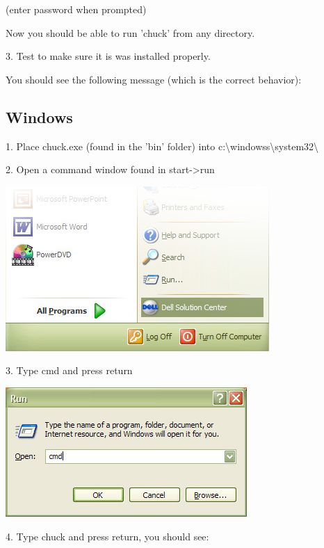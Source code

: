 (enter password when prompted)


Now you should be able to run 'chuck' from any directory.

3. Test to make sure it is was installed properly.


You should see the following message (which is the correct behavior):



\subsection{Windows}

1. Place chuck.exe (found in the 'bin' folder) into c:\textbackslash windowss\textbackslash system32\textbackslash

2. Open a command window found in start-\textgreater run

\includegraphics{images/startmenu}

3. Type cmd and press return

\includegraphics{images/cmd}

4. Type chuck and press return, you should see:


